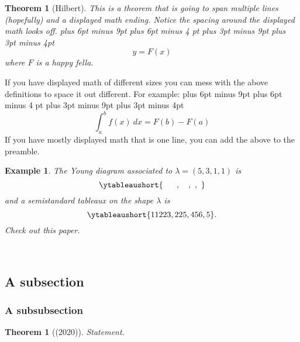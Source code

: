 \documentclass[12pt]{report} %
\numberwithin{equation}{subsection}
\numberwithin{figure}{chapter} %
\theoremstyle{numbernote}
\theoremstyle{nonumber}
\theoremstyle{nonumbernonote}
\newtheorem*{theorem*}{Theorem}
\newtheorem*{example*}{Example}
\theoremstyle{nonote}
\newtheorem{theorem}{Theorem}[subsection]
\begin{document}
\begin{theorem}[Hilbert]
    This is a theorem that is going to span multiple lines (hopefully) and a displayed math ending. Notice the spacing around the displayed math looks off.
    \begingroup %
        \abovedisplayskip=0pt plus 6pt minus 9pt
        \abovedisplayshortskip=0pt plus 6pt minus 4 pt
        \belowdisplayskip=0pt plus 3pt minus 9pt
        \belowdisplayshortskip=0pt plus 3pt minus 4pt
    \[
        y = F(x)
    \]
    \endgroup
    where \(F\) is a happy fella.
\end{theorem}

If you have displayed math of different sizes you can mess with the above definitions to space it out different. For example:
\begingroup
    \abovedisplayskip=6pt plus 6pt minus 9pt
    \abovedisplayshortskip=6pt plus 6pt minus 4 pt
    \belowdisplayskip=6pt plus 3pt minus 9pt
    \belowdisplayshortskip=6pt plus 3pt minus 4pt
\[
    \int_a^b f(x) ~ dx = F(b) - F(a)
\]
\endgroup
If you have mostly displayed math that is one line, you can add the above to the preamble. 

\begin{example*}
    The Young diagram associated to \(\lambda = (5, 3, 1, 1)\) is 
    \[
        \ytableaushort{~~~~~,~~~,~,~}
    \]
    and a semistandard tableaux on the shape \(\lambda\) is
    \[
        \ytableaushort{1 1 2 2 3,2 2 5,4 5 6, 5}.
    \]
    Check out this paper. \parencite{sam2011pieri}
\end{example*}
~ \vspace{-25.92pt} %

\subsection{A subsection}

\lipsum[1]

\subsubsection{A subsubsection}

\lipsum[1]

\begin{theorem*}[(2020)] %
    Statement.
\end{theorem*}
\end{document}

